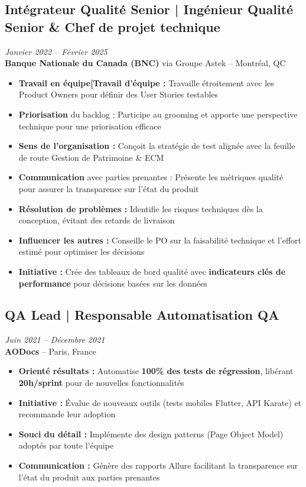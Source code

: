 \documentclass[11pt,a4paper]{article}
\newcommand{\highlight}[1]{\textcolor{primaryblue}{\textbf{#1}}}
\newcommand{\keypoint}[1]{\textbf{#1}}
\begin{document}
\subsection*{Intégrateur Qualité Senior | Ingénieur Qualité Senior \& Chef de projet technique} \hfill \textit{\color{mediumgray}Janvier 2022 -- Février 2025}\\
\textcolor{primaryblue}{\textbf{Banque Nationale du Canada (BNC)}} via Groupe Astek -- Montréal, QC
\begin{itemize}[leftmargin=22pt]
    \item \highlight{Travail en équipe[Travail d'équipe :} Travaille étroitement avec les Product Owners pour définir des User Stories testables
    \item \highlight{Priorisation} du backlog : Participe au grooming et apporte une perspective technique pour une priorisation efficace
    \item \highlight{Sens de l'organisation :} Conçoit la stratégie de test alignée avec la feuille de route Gestion de Patrimoine \& ECM
    \item \highlight{Communication} avec parties prenantes : Présente les métriques qualité pour assurer la transparence sur l'état du produit
    \item \highlight{Résolution de problèmes :} Identifie les risques techniques dès la conception, évitant des retards de livraison
    \item \highlight{Influencer les autres :} Conseille le PO sur la faisabilité technique et l'effort estimé pour optimiser les décisions
    \item \highlight{Initiative :} Crée des tableaux de bord qualité avec \highlight{indicateurs clés de performance} pour décisions basées sur les données
\end{itemize}

\subsection*{QA Lead | Responsable Automatisation QA} \hfill \textit{\color{mediumgray}Juin 2021 -- Décembre 2021}\\
\textcolor{primaryblue}{\textbf{AODocs}} -- Paris, France
\begin{itemize}[leftmargin=22pt]
    \item \highlight{Orienté résultats :} Automatise \keypoint{100\% des tests de régression}, libérant \keypoint{20h/sprint} pour de nouvelles fonctionnalités
    \item \highlight{Initiative :} Évalue de nouveaux outils (tests mobiles Flutter, API Karate) et recommande leur adoption
    \item \highlight{Souci du détail :} Implémente des design patterns (Page Object Model) adoptés par toute l'équipe
    \item \highlight{Communication :} Génère des rapports Allure facilitant la transparence sur l'état du produit aux parties prenantes
\end{itemize}
\end{document}
